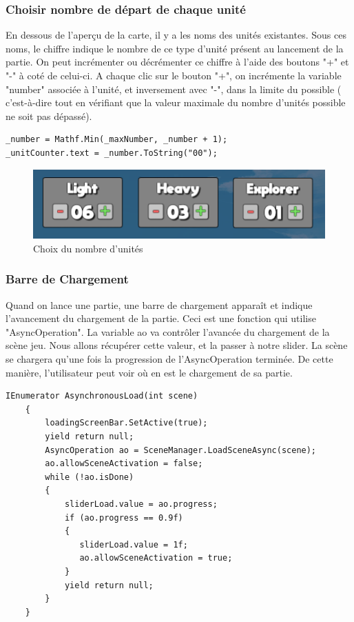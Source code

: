 \documentclass{report}
\begin{document}
\subsubsection{Choisir nombre de départ de chaque unité}
En dessous de l’aperçu de la carte, il y a les noms des unités existantes. Sous ces noms, le chiffre indique le nombre de ce type d'unité présent au lancement de la partie. On peut incrémenter ou décrémenter ce chiffre à l'aide des boutons "+" et "-" à coté de celui-ci. A chaque clic sur le bouton "+", on incrémente la variable "number" associée à l'unité, et inversement avec "-", dans la limite du possible ( c'est-à-dire tout en vérifiant que la valeur maximale du nombre d'unités possible ne soit pas dépassé).

\begin{lstlisting}[language={[Sharp]C},label={lst:Add()}, caption= Extrait du code de UnitSettingMenu.cs]
_number = Mathf.Min(_maxNumber, _number + 1);
_unitCounter.text = _number.ToString("00");
\end{lstlisting}

\begin{figure}[!h]
	\centering
		\includegraphics[scale=0.80]{NumberUnits}
	\caption{Choix du nombre d'unités}
\end{figure}
\clearpage
\subsubsection{Barre de Chargement}
Quand on lance une partie, une barre de chargement apparaît et indique l'avancement du chargement de la partie.
Ceci est une fonction qui utilise "AsyncOperation". La variable ao va contrôler l'avancée du chargement de la scène jeu.
Nous allons récupérer cette valeur, et la passer à notre slider.
La scène se chargera qu'une fois la progression de l'AsyncOperation terminée.
De cette manière, l'utilisateur peut voir où en est le chargement de sa partie.

\begin{lstlisting}[language={[Sharp]C},label={lst:Add()}, caption= Extrait du code de UnitSettingMenu.cs]
IEnumerator AsynchronousLoad(int scene)
    {
        loadingScreenBar.SetActive(true);
        yield return null;
        AsyncOperation ao = SceneManager.LoadSceneAsync(scene);
        ao.allowSceneActivation = false;
        while (!ao.isDone)
        {
            sliderLoad.value = ao.progress;
            if (ao.progress == 0.9f)
            { 
               sliderLoad.value = 1f;
               ao.allowSceneActivation = true;
            }
            yield return null;
        }
    }
\end{lstlisting}
\end{document}
